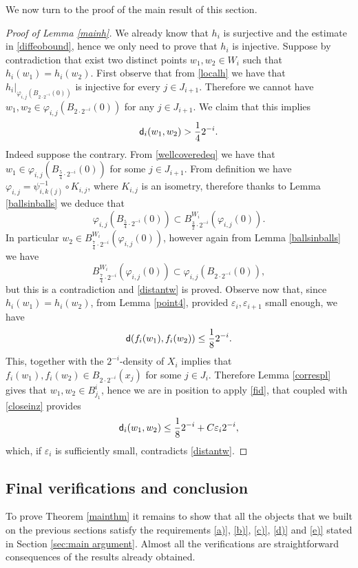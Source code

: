 \documentclass[11pt]{article}
\newcommand{\eps}{\varepsilon}
\newcommand{\sfd}{{\sf d}}
\renewcommand{\phi}{\varphi}
\theoremstyle{plain}
\theoremstyle{definition}
\numberwithin{equation}{section}
\begin{document}
We now turn to the proof of the main result of this section.
\begin{proof}[Proof of Lemma \ref{mainh}]
	We already know that $h_i$ is surjective and the estimate in \eqref{diffeobound},  hence we only need to prove that $h_i$ is injective. Suppose by contradiction that exist two distinct points $w_1,w_2 \in W_i$ such that $h_i(w_1)=h_i(w_2).$ First observe that from \eqref{localh} we have that $h_i|_{\phi_{i,j}(B_{2 \cdot 2^{-i}}(0))}$ is injective for every $j \in J_{i+1}.$ Therefore we cannot have $w_1,w_2 \in \phi_{i,j}(B_{2 \cdot 2^{-i}}(0))$ for any $j \in J_{i+1}.$ We claim that this implies
	\begin{equation}\label{distantw}
		\sfd_i(w_1,w_2)>\frac{1}{4}2^{-i}.
	\end{equation}
	Indeed suppose the contrary. From  \eqref{wellcoveredeq} we have that $w_1 \in \phi_{i,j}(B_{\frac{5}{4} \cdot 2^{-i}}(0))$ for some $j \in J_{i+1}.$ From definition we have $\phi_{i,j}=\psi_{i,k(j)}^{-1} \circ K_{i,j}$, where $K_{i,j}$ is an isometry, therefore thanks to Lemma \ref{ballsinballs}  we deduce that
	\[\phi_{i,j}(B_{\frac{5}{4} \cdot 2^{-i}}(0))\subset B^{W_i}_{\frac{3}{2} \cdot 2^{-i}}(\phi_{i,j}(0)). \]
	In particular $w_2 \in B^{W_i}_{\frac{7}{4} \cdot 2^{-i}}(\phi_{i,j}(0))$, however again from Lemma \ref{ballsinballs} we have
	\[B^{W_i}_{\frac{7}{4} \cdot 2^{-i}}(\phi_{i,j}(0))\subset \phi_{i,j}(B_{2 \cdot 2^{-i}}(0)),\]
	but this is a contradiction and \eqref{distantw} is proved. Observe now that, since $h_i(w_1)=h_i(w_2)$, from Lemma \ref{point4}, provided $\eps_i,\eps_{i+1}$ small enough, we  have  
	\begin{equation}\label{closeinz}
		\sfd(f_i(w_1),f_i(w_2))\le \frac{1}{8}2^{-i}.
	\end{equation} This, together with the $2^{-i}$-density of $X_i$ implies that $f_i(w_1),f_i(w_2) \in B_{2\cdot 2^{-i}}(x_{j})$ for some $j \in J_i$. Therefore  Lemma \ref{correspl} gives that $w_1,w_2 \in B_{j_1}^i$, hence we are in position to apply \eqref{fid}, that coupled with \eqref{closeinz} provides
	\[\sfd_i(w_1,w_2)\le  \frac{1}{8}2^{-i}+C\eps_i2^{-i},\]
	which, if $\eps_i$ is sufficiently small, contradicts \eqref{distantw}. 
\end{proof}

\subsection{Final verifications and conclusion}
To prove Theorem \ref{mainthm} it remains to show that all the objects that we built on the previous sections satisfy the requirements \ref{a)}, \ref{b)}, \ref{c)}, \ref{d)} and \ref{e)} stated in Section \ref{sec:main argument}. Almost all the verifications are straightforward consequences of the results already obtained.
\end{document}
